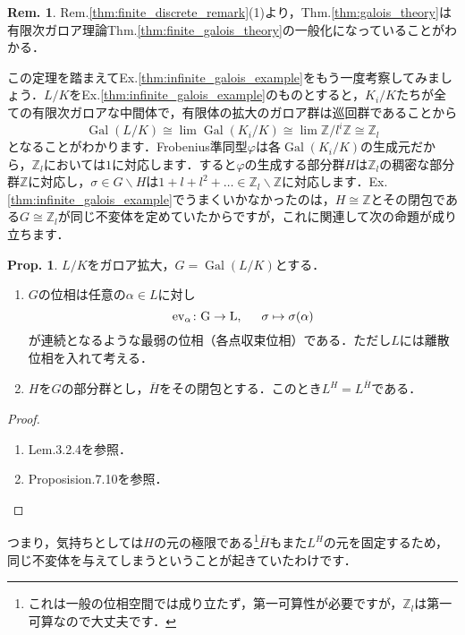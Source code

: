 \documentclass[dvipdfmx,b5paper,papersize]{jsarticle}
\theoremstyle{definition}
\newtheorem{prop}[thm]{Prop.}
\newtheorem{rem}[thm]{Rem.}
\DeclareMathOperator{\Gal}{Gal}
\begin{document}
\begin{rem}
  Rem.\ref{thm:finite_discrete_remark}(1)より，Thm.\ref{thm:galois_theory}は有限次ガロア理論Thm.\ref{thm:finite_galois_theory}の一般化になっていることがわかる．
\end{rem}

この定理を踏まえてEx.\ref{thm:infinite_galois_example}をもう一度考察してみましょう．$L/K$をEx.\ref{thm:infinite_galois_example}のものとすると，$K_i/K$たちが全ての有限次ガロアな中間体で，有限体の拡大のガロア群は巡回群であることから
\[
\Gal(L/K) \cong \lim \Gal(K_i/K) \cong \lim \mathbb{Z}/l^i\mathbb{Z} \cong \mathbb{Z}_l
\]
となることがわかります．Frobenius準同型$\varphi$は各$\Gal(K_i/K)$の生成元だから，$\mathbb{Z}_l$においては$1$に対応します．すると$\varphi$の生成する部分群$H$は$\mathbb{Z}_l$の稠密な部分群$\mathbb{Z}$に対応し，$\sigma \in G \backslash H$は$1+l+l^2+ \dots \in \mathbb{Z}_l \backslash \mathbb{Z}$に対応します．Ex.\ref{thm:infinite_galois_example}でうまくいかなかったのは，$H \cong \mathbb{Z}$とその閉包である$G \cong \mathbb{Z}_l$が同じ不変体を定めていたからですが，これに関連して次の命題が成り立ちます．

\begin{prop}
  $L/K$をガロア拡大，$G=\Gal(L/K)$とする．
  \begin{enumerate}
    \item $G$の位相は任意の$\alpha \in L$に対し
    \[
    \rm{ev}_{\alpha} \colon G \to L,\hspace{15pt} \sigma \mapsto \sigma(\alpha)
    \]
    が連続となるような最弱の位相（各点収束位相）である．ただし$L$には離散位相を入れて考える．
    \item $H$を$G$の部分群とし，$\overline{H}$をその閉包とする．このとき$L^H=L^{\overline{H}}$である．
  \end{enumerate}
\end{prop}
\begin{proof}
  \begin{enumerate}
    \item \cite{Borceux} Lem.3.2.4を参照．
    \item \cite{Milne} Proposision.7.10を参照．
  \end{enumerate}
\end{proof}

つまり，気持ちとしては$H$の元の極限である\footnote{これは一般の位相空間では成り立たず，第一可算性が必要ですが，$\mathbb{Z}_l$は第一可算なので大丈夫です．}$\overline{H}$もまた$L^H$の元を固定するため，同じ不変体を与えてしまうということが起きていたわけです．
\end{document}
